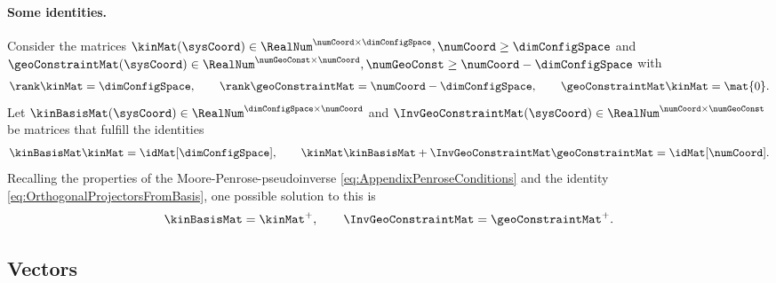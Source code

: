 \paragraph{Some identities.}
Consider the matrices $\kinMat(\sysCoord) \in \RealNum^{\numCoord\times\dimConfigSpace}, \numCoord \geq \dimConfigSpace$ and $\geoConstraintMat(\sysCoord)\in\RealNum^{\numGeoConst\times\numCoord}, \numGeoConst \geq \numCoord-\dimConfigSpace$ with
\begin{align}
 \rank\kinMat = \dimConfigSpace,
\qquad
 \rank\geoConstraintMat = \numCoord - \dimConfigSpace,
\qquad
 \geoConstraintMat\kinMat = \mat{0}.
\end{align}
Let $\kinBasisMat(\sysCoord)\in\RealNum^{\dimConfigSpace\times\numCoord}$ and $\InvGeoConstraintMat(\sysCoord)\in\RealNum^{\numCoord\times\numGeoConst}$ be matrices that fulfill the identities
\begin{align}\label{eq:KinIdentities}
 \kinBasisMat \kinMat = \idMat[\dimConfigSpace],
\qquad
 \kinMat \kinBasisMat + \InvGeoConstraintMat \geoConstraintMat = \idMat[\numCoord].
\end{align}
Recalling the properties of the Moore-Penrose-pseudoinverse \eqref{eq:AppendixPenroseConditions} and the identity \eqref{eq:OrthogonalProjectorsFromBasis}, one possible solution to this is
\begin{align}
 \kinBasisMat = \kinMat^+, \qquad \InvGeoConstraintMat = \geoConstraintMat^+.
\end{align}

\subsection{Vectors}
